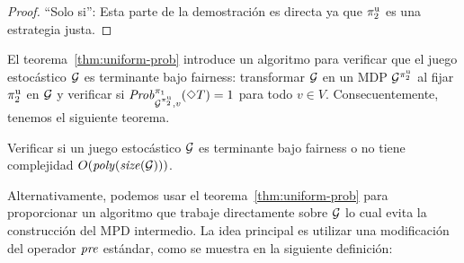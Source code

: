 \begin{proof}
\noindent ``Solo si'': Esta parte de la demostración es directa ya que $\pi^{\mathrm{u}}_{2}$ es una estrategia justa.
\qedhere
\end{proof} 

El teorema~\ref{thm:uniform-prob} introduce un algoritmo para verificar que el juego estocástico $\mathcal{G}$ es terminante bajo fairness: transformar
$\mathcal{G}$ en un MDP $\mathcal{G}^{\pi^{\mathrm{u}}_{2}}$ al fijar
$\pi^{\mathrm{u}}_{2}$ en $\mathcal{G}$ y verificar si
$\mathit{Prob}^{\pi_{1}}_{\mathcal{G}^{\pi^{\mathrm{u}}_{2}},v}(\Diamond T)=1$ para todo $v\in V$.
%
Consecuentemente, tenemos el siguiente teorema.

\begin{theorem}\label{th:fair-is-poly}
  Verificar si un juego estocástico $\mathcal{G}$ es terminante bajo
  fairness o no tiene complejidad $O(\mathit{poly}(\mathit{size}(\mathcal{G})))$.
\end{theorem}


Alternativamente, podemos usar el teorema~\ref{thm:uniform-prob} para proporcionar un
algoritmo que trabaje directamente sobre $\mathcal{G}$ lo cual evita la construcción del
MPD intermedio.
%
La idea principal es utilizar una modificación del operador $\mathit{pre}$
estándar, como se muestra en la siguiente definición:

